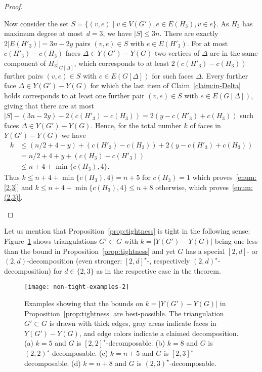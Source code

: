 \documentclass[a4paper,10pt]{article}
\theoremstyle{plain}
\begin{document}
\begin{proof}
\begin{description}
   Now consider the set $S = \{(v,e) \mid v \in V(G'), e \in E(H_3), v \in e\}$.
   As $H_3$ has maximum degree at most~$d=3$, we have $|S| \leq 3n$.
   There are exactly $2|E(H'_3)| = 3n-2y$ pairs $(v,e) \in S$ with $e \in E(H'_3)$.
   For at most $c(H'_3) - c(H_3)$ faces $\Delta \in Y(G')-Y(G)$ two vertices of $\Delta$ are in the same component of $H_3|_{G[\Delta]}$, which corresponds to at least $2(c(H'_3)-c(H_3))$ further pairs $(v,e) \in S$ with $e \in E(G[\Delta])$ for such faces $\Delta$.
   Every further face $\Delta \in Y(G')-Y(G)$ for which the last item of Claim~\ref{claim:in-Delta} holds corresponds to at least one further pair $(v,e) \in S$ with $e \in E(G[\Delta])$, giving that there are at most $|S| - (3n-2y) - 2(c(H'_3)-c(H_3)) = 2(y - c(H'_3) + c(H_3))$ such faces $\Delta \in Y(G')-Y(G)$.
   Hence, for the total number $k$ of faces in $Y(G') - Y(G)$ we have 
   \begin{align*}
    k & \leq (n/2 + 4 - y) + (c(H'_3) - c(H_3)) + 2(y - c(H'_3) + c(H_3)) \\
    & = n/2 + 4 + y + (c(H_3) - c(H'_3)) \\
    & \leq n + 4 + \min\{c(H_3),4\}.
   \end{align*}   
   Thus $k \leq n+4+\min\{c(H_3),4\} = n+5$ for $c(H_3)=1$ which proves~\ref{enum:[2,3]} and $k \leq n+4+\min\{c(H_3),4\} \leq n+8$ otherwise, which proves~\ref{enum:(2,3)}.\qedhere
 \end{description}
\end{proof}

Let us mention that Proposition~\ref{prop:tightness} is tight in the following sense:
Figure~\ref{fig:non-tight-examples} shows triangulations $G' \subset G$ with $k = |Y(G')-Y(G)|$ being one less than the bound in Proposition~\ref{prop:tightness} and yet $G$ has a special $[2,d]$- or $(2,d)$-decomposition (even stronger: $[2,d]^\star$-, respectively $(2,d)^\star$-decomposition) for $d \in \{2,3\}$ as in the respective case in the theorem.

\begin{figure}[tb]
 \centering
 \texttt{[image: non-tight-examples-2]}
 \caption{Examples showing that the bounds on $k = |Y(G')-Y(G)|$ in Proposition~\ref{prop:tightness} are best-possible.
  The triangulation $G'\subset G$ is drawn with thick edges, gray areas indicate faces in $Y(G')-Y(G)$, and edge colors indicate a claimed decomposition.
  (a) $k = 5$ and $G$ is $[2,2]^\star$-decomposable.
  (b) $k = 8$ and $G$ is $(2,2)^\star$-decomposable.
  (c) $k = n + 5$ and $G$ is $[2,3]^\star$-decomposable.
  (d) $k = n + 8$ and $G$ is $(2,3)^\star$-decomposable.}
 \label{fig:non-tight-examples}
\end{figure}
\end{document}
